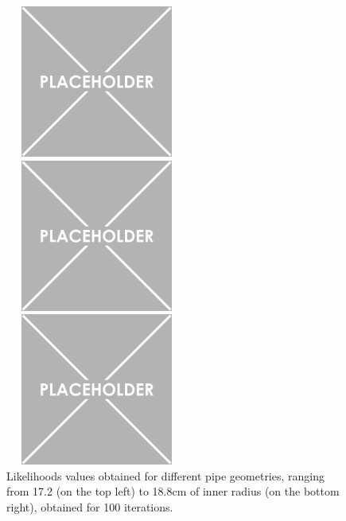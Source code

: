 \documentclass[a4paper, 11pt]{report}
\begin{document}
\begin{figure}[htbp]
\begin{minipage}[b]{.32\textwidth}
\includegraphics[width=6cm, height=5cm]{figs/placeholder.png}
\end{minipage}\hfill
\begin{minipage}[b]{.32\textwidth}
\includegraphics[width=6cm, height=5cm]{figs/placeholder.png}
\end{minipage} \hfill
\begin{minipage}[b]{.32\textwidth}
\includegraphics[width=6cm, height=5cm]{figs/placeholder.png}
\end{minipage} \hfill
\caption{Likelihoods values obtained for different pipe geometries, ranging from 17.2 (on the top left) to 18.8cm of inner radius (on the bottom right), obtained for 100 iterations.}
\label{fig:likelihoods}
\end{figure}
\end{document}
